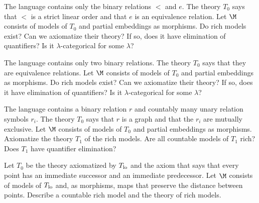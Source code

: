 
\begin{exercise}\label{ex_dlo+eqiovalenza}
  The language contains only the binary relations $<$ and $e$.
  The theory $T_0$ says that $<$ is a strict linear order and that $e$ is an equivalence relation.
  Let $\M$ consists of models of $T_0$ and partial embeddings as morphisms.
  Do rich models exist? Can we axiomatize their theory? If so, does it have elimination of quantifiers? Is it $\lambda$-categorical for some $\lambda$?
\end{exercise}

\begin{exercise}\label{ex_2bin_equivalenze}
  The language contains only two binary relations.
  The theory $T_0$ says that they are equivalence relations.
  Let $\M$ consists of models of $T_0$ and partial embeddings as morphisms.
  Do rich models exist? Can we axiomatize their theory? If so, does it have elimination of quantifiers? Is it $\lambda$-categorical for some $\lambda$?
\end{exercise}

\begin{exercise}
  The language contains a binary relation $r$ and countably many unary relation symbols $r_i$.
  The theory $T_0$ says that $r$ is a graph and that the $r_i$ are mutually exclusive.
  Let $\M$ consists of models of $T_0$ and partial embeddings as morphisms.
  Axiomatize the theory $T_1$ of the rich models.
  Are all countable models of $T_1$ rich?
  Does $T_1$ have quantifier elimination?
\end{exercise}

\begin{exercise}
  Let $T_0$ be the theory axiomatized by $T_{\rm lo}$ and the axiom that says that every point has an immediate successor and an immediate predecessor.
  Let $\M$ consists of models of $T_{\rm lo}$ and, as morphisms, maps that preserve the distance between points.
  Describe a countable rich model and the theory of rich models.
\end{exercise}

